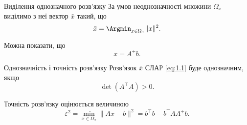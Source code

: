 \begin{mframe}{Виділення однозначного розв'язку}
    За умов неоднозначності множини $\Omega_x$ виділимо з неї вектор $\bar x$
    такий, що
    \begin{equation}
        \label{eq:1.3}
        \bar x = \Argmin_{x \in \Omega_x} \|x\|^2.
    \end{equation}

    Можна показати, що
    \begin{equation}
        \label{eq:1.4b}
        \bar x = A^+ b.
    \end{equation}
\end{mframe}

\begin{mframe}{Однозначність і точність розв'язку}
    Розв'язок $\bar x$ СЛАР \eqref{eq:1.1} буде однозначним, якщо
    \begin{equation}
        \label{eq:1.7}
        \det (A^\intercal A) > 0.
    \end{equation}

    Точність розв'язку оцінюється величиною
    \begin{equation}
        \label{eq:1.8}
        \varepsilon^2 = \min_{x \in \Omega_x} \|A x - b\|^2 = 
        b^\intercal b - b^\intercal A A^+ b.
    \end{equation}
\end{mframe}
